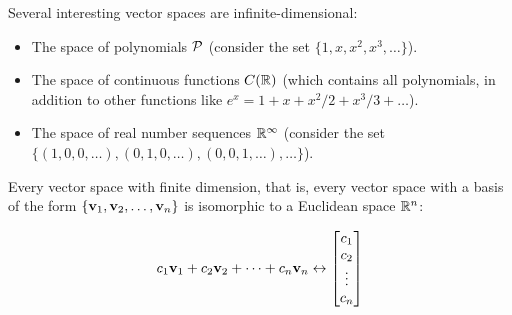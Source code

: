\begin{applicationActivities}{3}{14}
\begin{observation}
  Several interesting vector spaces are infinite-dimensional:
  \begin{itemize}
    \item The space of polynomials \(\P\) (consider the set
          \(\{1,x,x^2,x^3,\dots\}\)).
    \item The space of continuous functions \(C(\IR)\) (which contains
          all polynomials, in addition to other functions like
          \(e^x=1+x+x^2/2+x^3/3+\dots\)).
    \item The space of real number sequences \(\IR^\infty\) (consider
          the set \(\{(1,0,0,\dots),(0,1,0,\dots),(0,0,1,\dots),\dots\}\)).
  \end{itemize}
\end{observation}

\begin{fact}
  Every vector space with finite dimension, that is, every
  vector space with a basis of the form
  \(\{\vect v_1,\vect v_2,\dots,\vect v_n\}\) is isomorphic to a
  Euclidean space \(\IR^n\):

  \[
    c_1\vect v_1+c_2\vect v_2+\dots+c_n\vect v_n
    \leftrightarrow
    \begin{bmatrix}
      c_1\\c_2\\\vdots\\c_n
    \end{bmatrix}
  \]
\end{fact}

\end{applicationActivities}
